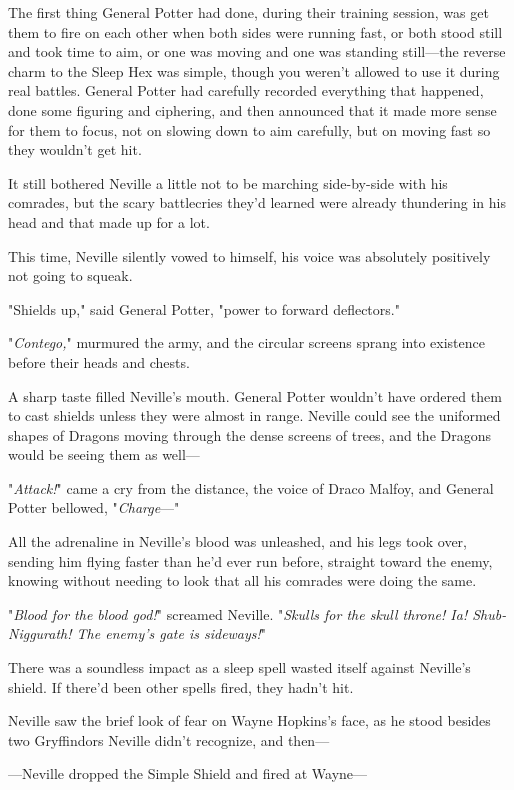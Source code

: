 The first thing General Potter had done, during their training session, was get
them to fire on each other when both sides were running fast, or both stood
still and took time to aim, or one was moving and one was standing still---the
reverse charm to the Sleep Hex was simple, though you weren't allowed to use it
during real battles. General Potter had carefully recorded everything that
happened, done some figuring and ciphering, and then announced that it made
more sense for them to focus, not on slowing down to aim carefully, but on
moving fast so they wouldn't get hit.

It still bothered Neville a little not to be marching side-by-side with his
comrades, but the scary battlecries they'd learned were already thundering in
his head and that made up for a lot.

This time, Neville silently vowed to himself, his voice was absolutely
positively not going to squeak.

"Shields up," said General Potter, "power to forward deflectors."

"\emph{Contego,}" murmured the army, and the circular screens sprang into
existence before their heads and chests.

A sharp taste filled Neville's mouth. General Potter wouldn't have ordered them
to cast shields unless they were almost in range. Neville could see the
uniformed shapes of Dragons moving through the dense screens of trees, and the
Dragons would be seeing them as well---

"\emph{Attack!}" came a cry from the distance, the voice of Draco Malfoy, and
General Potter bellowed, "\emph{Charge}\mbox{---}"

All the adrenaline in Neville's blood was unleashed, and his legs took over,
sending him flying faster than he'd ever run before, straight toward the enemy,
knowing without needing to look that all his comrades were doing the same.

"\emph{Blood for the blood god!}" screamed Neville. "\emph{Skulls for the skull
throne! Ia! Shub-Niggurath! The enemy's gate is sideways!}"

There was a soundless impact as a sleep spell wasted itself against Neville's
shield. If there'd been other spells fired, they hadn't hit.

Neville saw the brief look of fear on Wayne Hopkins's face, as he stood besides
two Gryffindors Neville didn't recognize, and then---

---Neville dropped the Simple Shield and fired at Wayne---

